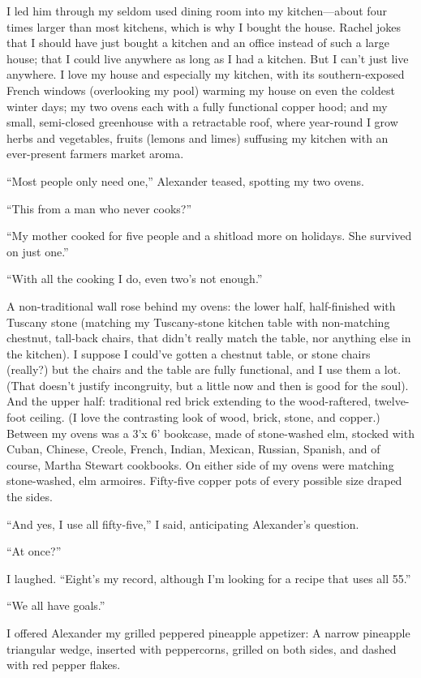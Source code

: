 I led him through my seldom used dining room into my kitchen---about
four times larger than most kitchens, which is why I bought the house.
Rachel jokes that I should have just bought a kitchen and an office
instead of such a large house; that I could live anywhere as long as I
had a kitchen. But I can't just live anywhere. I love my house and
especially my kitchen, with its southern-exposed French windows
(overlooking my pool) warming my house on even the coldest winter days;
my two ovens each with a fully functional copper hood; and my small,
semi-closed greenhouse with a retractable roof, where year-round I grow
herbs and vegetables, fruits (lemons and limes) suffusing my kitchen
with an ever-present farmers market aroma.

``Most people only need one,'' Alexander teased, spotting my two ovens.

``This from a man who never cooks?''

``My mother cooked for five people and a shitload more on holidays. She
survived on just one.''

``With all the cooking I do, even two's not enough.''

A non-traditional wall rose behind my ovens: the lower half,
half-finished with Tuscany stone (matching my Tuscany-stone kitchen
table with non-matching chestnut, tall-back chairs, that didn't really
match the table, nor anything else in the kitchen). I suppose I could've
gotten a chestnut table, or stone chairs (really?) but the chairs and
the table are fully functional, and I use them a lot. (That doesn't
justify incongruity, but a little now and then is good for the soul).
And the upper half: traditional red brick extending to the
wood-raftered, twelve-foot ceiling. (I love the contrasting look of
wood, brick, stone, and copper.) Between my ovens was a 3'x 6' bookcase,
made of stone-washed elm, stocked with Cuban, Chinese, Creole, French,
Indian, Mexican, Russian, Spanish, and of course, Martha Stewart
cookbooks. On either side of my ovens were matching stone-washed, elm
armoires. Fifty-five copper pots of every possible size draped the
sides.

``And yes, I use all fifty-five,'' I said, anticipating Alexander's
question.

``At once?''

I laughed. ``Eight's my record, although I'm looking for a recipe that
uses all 55.''

``We all have goals.''

I offered Alexander my grilled peppered pineapple appetizer: A narrow
pineapple triangular wedge, inserted with peppercorns, grilled on both
sides, and dashed with red pepper flakes.

